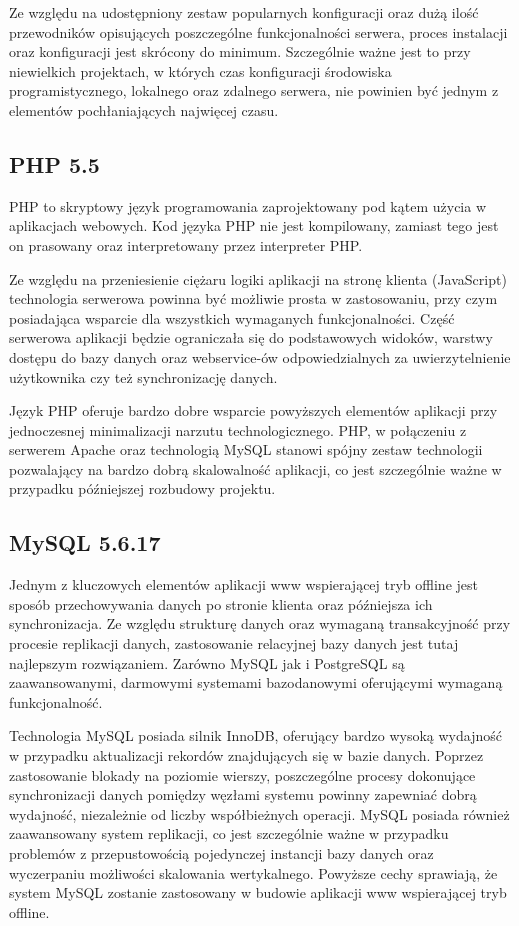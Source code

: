Ze względu na udostępniony zestaw popularnych konfiguracji oraz dużą ilość przewodników opisujących poszczególne funkcjonalności serwera, proces instalacji oraz konfiguracji jest skrócony do minimum. Szczególnie ważne jest to przy niewielkich projektach, w których czas konfiguracji środowiska programistycznego, lokalnego oraz zdalnego serwera, nie powinien być jednym z elementów pochłaniających najwięcej czasu.

\subsection{PHP 5.5}
\label{sec:php}

PHP to skryptowy język programowania zaprojektowany pod kątem użycia w aplikacjach webowych. Kod języka PHP nie jest kompilowany, zamiast tego jest on prasowany oraz interpretowany przez interpreter PHP.

Ze względu na przeniesienie ciężaru logiki aplikacji na stronę klienta (JavaScript) technologia serwerowa powinna być możliwie prosta w zastosowaniu, przy czym posiadająca wsparcie dla wszystkich wymaganych funkcjonalności. Część serwerowa aplikacji będzie ograniczała się do podstawowych widoków, warstwy dostępu do bazy danych oraz webservice-ów odpowiedzialnych za uwierzytelnienie użytkownika czy też synchronizację danych.

Język PHP oferuje bardzo dobre wsparcie powyższych elementów aplikacji przy jednoczesnej minimalizacji narzutu technologicznego. PHP, w połączeniu z serwerem Apache oraz technologią MySQL stanowi spójny zestaw technologii pozwalający na bardzo dobrą skalowalność aplikacji, co jest szczególnie ważne w przypadku późniejszej rozbudowy projektu.

\subsection{MySQL 5.6.17}
\label{sec:mysql}

Jednym z kluczowych elementów aplikacji www wspierającej tryb offline jest sposób przechowywania danych po stronie klienta oraz późniejsza ich synchronizacja. Ze względu strukturę danych oraz wymaganą transakcyjność przy procesie replikacji danych, zastosowanie relacyjnej bazy danych jest tutaj najlepszym rozwiązaniem. Zarówno MySQL jak i PostgreSQL są zaawansowanymi, darmowymi systemami bazodanowymi oferującymi wymaganą funkcjonalność.

Technologia MySQL posiada silnik InnoDB, oferujący bardzo wysoką wydajność w przypadku aktualizacji rekordów znajdujących się w bazie danych. Poprzez zastosowanie blokady na poziomie wierszy, poszczególne procesy dokonujące synchronizacji danych pomiędzy węzłami systemu powinny zapewniać dobrą wydajność, niezależnie od liczby współbieżnych operacji. MySQL posiada również zaawansowany system replikacji, co jest szczególnie ważne w przypadku problemów z przepustowością pojedynczej instancji bazy danych oraz wyczerpaniu możliwości skalowania wertykalnego. Powyższe cechy sprawiają, że system MySQL zostanie zastosowany w budowie aplikacji www wspierającej tryb offline.

